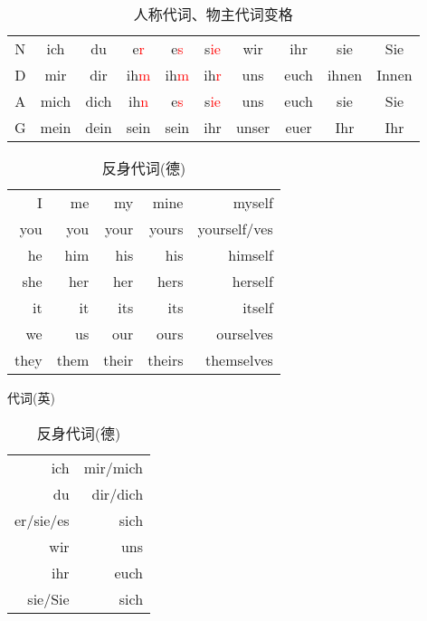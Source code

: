 \documentclass[12pt,A4paper,oneside,reqno]{amsart}
\numberwithin{equation}{section}
\theoremstyle{plain}
\theoremstyle{plain}
\theoremstyle{plain}
\numberwithin{equation}{section}
\theoremstyle{remark}
\begin{document}
\begin{table}[th]
	\begin{tabular}{|c|cc|ccc|cc|cc|}
		\hline
N	&	ich	&	du	&	e\textcolor{red}{r}	&	e\textcolor{red}{s}	&	s\textcolor{red}{ie}	&	wir	&	ihr	&	sie	&	Sie	\\
D	&	mir	&	dir	&	ih\textcolor{red}{m}	&	ih\textcolor{red}{m}	&	ih\textcolor{red}{r}	&	uns	&	euch	&	ihnen	&	Innen	\\
A	&	mich	&	dich	&	ih\textcolor{red}{n}	&	e\textcolor{red}{s}	&	s\textcolor{red}{ie}	&	uns	&	euch	&	sie	&	Sie	\\
\hline																			
G	&	mein	&	dein	&	sein	&	sein	&	ihr	&	unser	&	euer	&	Ihr	&	Ihr	\\




		
		\hline
	\end{tabular}
	\vspace{0.5cm}
	\caption{人称代词、物主代词变格}
\end{table}	
\begin{table}[ht]
	\begin{minipage}[t]{0.48\textwidth}
		\centering
		\begin{tabular}{|r|r|r|r|r|}
			\hline													
I	&	me	&	my	&	mine	&	myself	\\
you	&	you	&	your	&	yours	&	yourself/ves	\\
he	&	him	&	his	&	his	&	himself	\\
she	&	her	&	her	&	hers	&	herself	\\
it	&	it	&	its	&	its	&	itself	\\
we	&	us	&	our	&	ours	&	ourselves	\\
they	&	them	&	their	&	theirs	&	themselves	\\

			\hline									
			
		\end{tabular}
		\vspace{0.5cm}
		\caption{代词(英)}
	\end{minipage}
	\begin{minipage}[t]{0.48\textwidth}
		\centering
		\begin{tabular}{|r|r|}
			\hline									
ich	&	mir/mich	\\
du	&	dir/dich	\\
er/sie/es	&	sich	\\
wir	&	uns	\\
ihr	&	euch	\\
sie/Sie	&	sich	\\

			\hline									
			
		\end{tabular}
		\vspace{0.5cm}
		\caption{反身代词(德)}
	\end{minipage}

\end{table}
\end{document}
